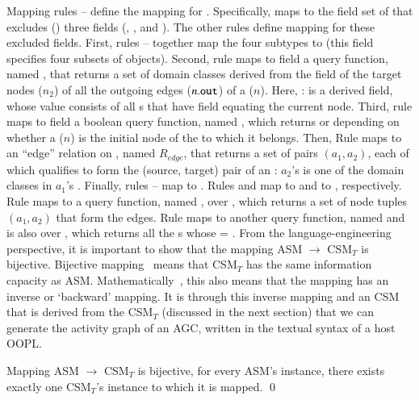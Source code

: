 Mapping rules -- define the mapping for . Specifically,  maps  to the field set of  that excludes () three fields (, , and ). 
The other rules define mapping for these excluded fields. 
%
First, rules -- together map the four  subtypes to  (this field specifies four subsets of  objects). 
%
%
Second, rule  maps to field  a query function, named , that returns a set of domain classes derived from the field  of the target nodes ($ n_2 $) of all the outgoing edges ($ n.{\tt out} $) of a  ($ n $). Here, :  is a derived field, whose value consists of all s that have field  equating the current node.
%
Third, rule  maps to field  a boolean query function, named , which returns  or  depending on whether a  ($ n $) is the initial node of the  to which it belongs. Then, Rule  maps  to an ``edge'' relation on , named $R_{edge}$, that returns a set of  pairs $ (a_1, a_2) $, each of which qualifies to form the (source, target) pair of an : $a_2$'s  is one of the domain classes in $a_1$'s .
%
Finally, rules -- map  to . Rules  and  map  to  and  to , respectively. Rule  maps  to a query function, named , over , which returns a set of node tuples $(a_1, a_2)$ that form the edges. Rule  maps  to another query function, named  and is also over , which returns all the s whose  = .
From the language-engineering perspective, it is important to show that the mapping ASM $ \rightarrow $ CSM$_T$ is bijective. Bijective mapping~\cite{stevens_landscape_2008} means that CSM$_T$ has the same information capacity as ASM. Mathematically~\cite{weisstein_bijective_2018}, this also means that the mapping has an inverse or `backward' mapping. It is through this inverse mapping and an CSM that is derived from the CSM$_T$ (discussed in the next section) that we can generate the activity graph of an AGC, written in the textual syntax of a host OOPL.
%
\begin{theorem} \label{thm:mapping-cm2cmt}
	Mapping ASM $\rightarrow$ CSM$_T$ is bijective, \ie for every ASM's instance, there exists exactly one CSM$_T$'s instance to which it is mapped. \qed 
\end{theorem}

